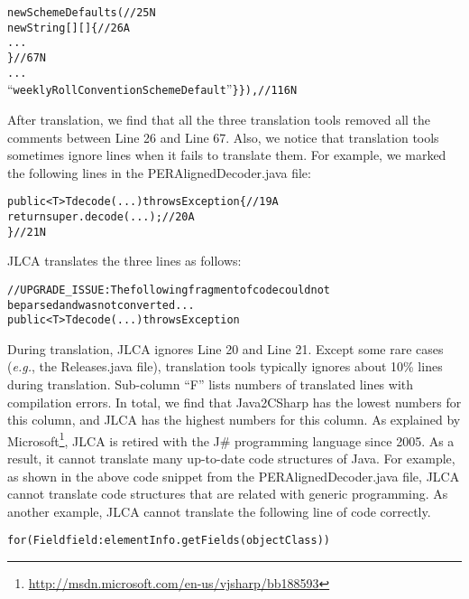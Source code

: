 \begin{CodeOut}%
\begin{alltt}
new SchemeDefaults (//25N
  new String [][] \{//26A
  ...
  \}//67N
  ...
``weeklyRollConventionSchemeDefault'' \} \}),//116N
\end{alltt}
\end{CodeOut}

After translation, we find that all the three translation tools removed all the comments between Line 26 and Line 67. Also, we notice that translation tools sometimes ignore lines when it fails to translate them. For example, we marked the following lines in the PERAlignedDecoder.java file:

\begin{CodeOut}%
\begin{alltt}
public <T> T decode(...) throws Exception \{//19A
  return super.decode(...);//20A
\}//21N
\end{alltt}
\end{CodeOut}

JLCA translates the three lines as follows:
\begin{CodeOut}%
\begin{alltt}
//UPGRADE_ISSUE: The following fragment of code could not
   be parsed and was not converted...
public < T > T decode(...) throws Exception
\end{alltt}
\end{CodeOut}

During translation, JLCA ignores Line 20 and Line 21. Except some rare cases (\emph{e.g.}, the Releases.java file), translation tools typically ignores about 10\% lines during translation. Sub-column ``F'' lists numbers of translated lines with compilation errors. In total, we find that Java2CSharp has the lowest numbers for this column, and JLCA has the highest numbers for this column. As explained by Microsoft\footnote{\url{http://msdn.microsoft.com/en-us/vjsharp/bb188593}}, JLCA is retired with the J\# programming language since 2005. As a result, it cannot translate many up-to-date code structures of Java. For example, as shown in the above code snippet from the PERAlignedDecoder.java file, JLCA cannot translate code structures that are related with generic programming. As another example, JLCA cannot translate the following line of code correctly.

\begin{CodeOut}%
\begin{alltt}
for(Field field : elementInfo.getFields(objectClass))
\end{alltt}
\end{CodeOut}

